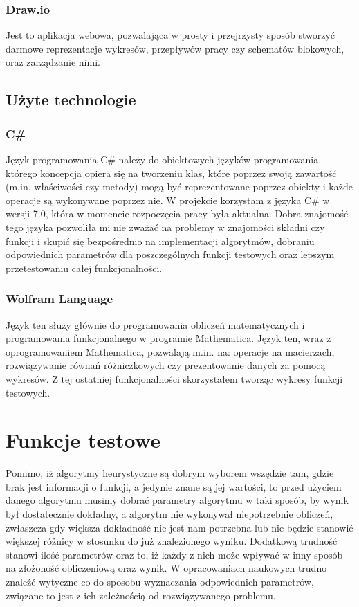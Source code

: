 \documentclass[twoside]{projektInzynierskiMS1}
\newcommand{\si}{ś}
\begin{document}
\subsubsection{Draw.io}
Jest to aplikacja webowa, pozwalająca w prosty i przejrzysty sposób stworzyć darmowe reprezentacje wykresów, przepływów pracy czy schematów blokowych, oraz zarządzanie nimi. 
	
	\subsection{Użyte technologie}
	\subsubsection{C\#}
Język programowania C\# należy do obiektowych języków programowania, którego koncepcja opiera się na tworzeniu klas, które poprzez swoją zawarto\si ć (m.in. wła\si ciwo\si ci czy metody) mogą być reprezentowane poprzez obiekty i każde operacje są wykonywane poprzez nie. W projekcie korzystam z języka C\# w wersji 7.0, która w momencie rozpoczęcia pracy była aktualna. Dobra znajomo\si ć tego języka pozwoliła mi nie zważać na problemy w znajomo\si ci składni czy funkcji i skupić się bezpo\si rednio na implementacji algorytmów, dobraniu odpowiednich parametrów dla poszczególnych funkcji testowych oraz lepszym przetestowaniu całej funkcjonalno\si ci.

\subsubsection{Wolfram Language}
Język ten służy głównie do programowania obliczeń matematycznych i programowania funkcjonalnego w programie Mathematica. Język ten, wraz z oprogramowaniem Mathematica, pozwalają m.in. na: operacje na macierzach, rozwiązywanie równań różniczkowych czy prezentowanie danych za pomocą wykresów. Z tej ostatniej funkcjonalno\si ci skorzystałem tworząc wykresy funkcji testowych.

\section{Funkcje testowe}
Pomimo, iż algorytmy heurystyczne są dobrym wyborem wszędzie tam, gdzie brak jest informacji o funkcji, a jedynie znane są jej warto\si ci, to przed użyciem danego algorytmu musimy dobrać parametry algorytmu w taki sposób, by wynik był dostatecznie dokładny, a algorytm nie wykonywał niepotrzebnie obliczeń, zwłaszcza gdy większa dokładno\si ć nie jest nam potrzebna lub nie będzie stanowić większej różnicy w stosunku do już znalezionego wyniku. Dodatkową trudno\si ć stanowi ilo\si ć parametrów oraz to, iż każdy z nich może wpływać w inny sposób na złożono\si ć obliczeniową oraz wynik. W opracowaniach naukowych trudno znaleźć wytyczne co do sposobu wyznaczania odpowiednich parametrów, związane to jest z ich zależno\si cią od rozwiązywanego problemu. \\
\end{document}
